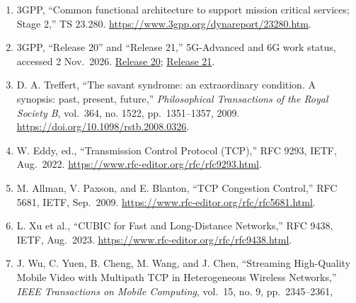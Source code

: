 \documentclass[
  american,
  11pt,
]{article}
\begin{document}
\begin{enumerate}
  3GPP, ``System architecture for the 5G System (5GS),'' TS 23.501.
  \url{https://www.3gpp.org/dynareport/23501.htm}.
\item
  3GPP, ``Common functional architecture to support mission critical
  services; Stage 2,'' TS 23.280.
  \url{https://www.3gpp.org/dynareport/23280.htm}.
\item
  3GPP, ``Release 20'' and ``Release 21,'' 5G-Advanced and 6G work
  status, accessed 2 Nov.~2026.
  \href{https://www.3gpp.org/specifications-technologies/releases/release-20}{Release
  20};
  \href{https://www.3gpp.org/specifications-technologies/releases/release-21}{Release
  21}.
\item
  D. A. Treffert, ``The savant syndrome: an extraordinary condition. A
  synopsis: past, present, future,'' \emph{Philosophical Transactions of
  the Royal Society B}, vol.~364, no. 1522, pp.~1351--1357, 2009.
  \url{https://doi.org/10.1098/rstb.2008.0326}.
\item
  W. Eddy, ed., ``Transmission Control Protocol (TCP),'' RFC 9293, IETF,
  Aug.~2022. \url{https://www.rfc-editor.org/rfc/rfc9293.html}.
\item
  M. Allman, V. Paxson, and E. Blanton, ``TCP Congestion Control,'' RFC
  5681, IETF, Sep.~2009.
  \url{https://www.rfc-editor.org/rfc/rfc5681.html}.
\item
  L. Xu et al., ``CUBIC for Fast and Long-Distance Networks,'' RFC 9438,
  IETF, Aug.~2023. \url{https://www.rfc-editor.org/rfc/rfc9438.html}.
\item
  J. Wu, C. Yuen, B. Cheng, M. Wang, and J. Chen, ``Streaming
  High-Quality Mobile Video with Multipath TCP in Heterogeneous Wireless
  Networks,'' \emph{IEEE Transactions on Mobile Computing}, vol.~15, no.
  9, pp.~2345--2361,


\end{enumerate}
\end{document}
